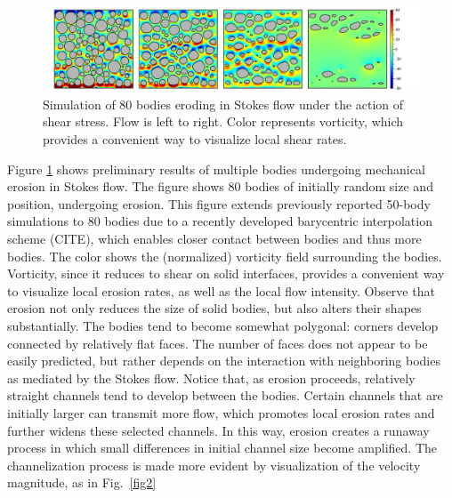 \documentclass[12pt]{article}
\begin{document}
\begin{figure}%
\begin{center}
\includegraphics[width = 0.99 \textwidth]{./figs/80circ8vort.pdf}
\caption{\label{fig1} Simulation of 80 bodies eroding in Stokes flow under the action of shear stress. Flow is left to right. Color represents vorticity, which provides a convenient way to visualize local shear rates. 
}
\end{center}
\end{figure}
 
 Figure \ref{fig1} shows preliminary results of multiple bodies undergoing mechanical erosion in Stokes flow. The figure shows 80 bodies of initially random size and position, undergoing erosion. This figure extends previously reported 50-body simulations to 80 bodies \cite{Quaife2018} due to a recently developed barycentric interpolation scheme (CITE), which enables closer contact between bodies and thus more bodies.
The color shows the (normalized) vorticity field surrounding the bodies. Vorticity, since it reduces to shear on solid interfaces, provides a convenient way to visualize local erosion rates, as well as the local flow intensity. Observe that erosion not only reduces the size of solid bodies, but also alters their shapes substantially. The bodies tend to become somewhat polygonal: corners develop connected by relatively flat faces. The number of faces does not appear to be easily predicted, but rather depends on the interaction with neighboring bodies as mediated by the Stokes flow. Notice that, as erosion proceeds, relatively straight channels tend to develop between the bodies. Certain channels that are initially larger can transmit more flow, which promotes local erosion rates and further widens these selected channels. In this way, erosion creates a runaway process in which small differences in initial channel size become amplified. The channelization process is made more evident by visualization of the velocity magnitude, as in Fig.~\ref{fig2}
\end{document}
